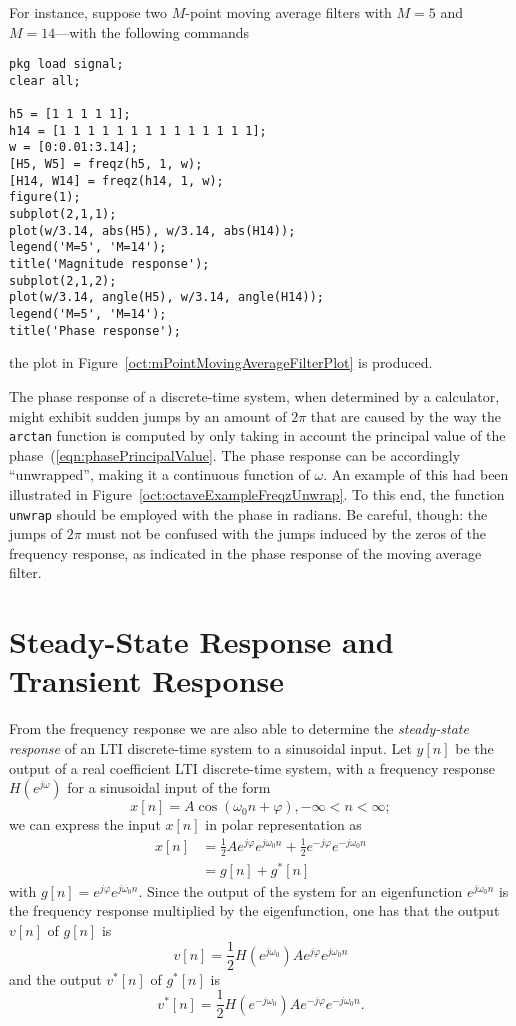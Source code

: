 \documentclass[\documentfontsize, twocolumn]{\classname}
\begin{document}
For instance, suppose two $M$-point moving average filters with $M=5$ and $M=14$---with the following commands
\begin{verbatim}
pkg load signal;
clear all;

h5 = [1 1 1 1 1];
h14 = [1 1 1 1 1 1 1 1 1 1 1 1 1 1];
w = [0:0.01:3.14];
[H5, W5] = freqz(h5, 1, w);
[H14, W14] = freqz(h14, 1, w);
figure(1);
subplot(2,1,1);
plot(w/3.14, abs(H5), w/3.14, abs(H14));
legend('M=5', 'M=14');
title('Magnitude response');
subplot(2,1,2);
plot(w/3.14, angle(H5), w/3.14, angle(H14));
legend('M=5', 'M=14');
title('Phase response');
\end{verbatim}
the plot in Figure~\ref{oct:mPointMovingAverageFilterPlot} is produced.

The phase response of a discrete-time system, when determined by a calculator, might exhibit sudden jumps by an amount of $2\pi$ that are caused by the way the \texttt{arctan} function is computed by only taking in account the principal value of the phase~(\ref{eqn:phasePrincipalValue}. The phase response can be accordingly ``unwrapped'', making it a continuous function of $\omega$. An example of this had been illustrated in Figure~\ref{oct:octaveExampleFreqzUnwrap}. To this end, the function \texttt{unwrap} should be employed with the phase in radians. Be careful, though: the jumps of $2\pi$ must not be confused with the jumps induced by the zeros of the frequency response, as indicated in the phase response of the moving average filter.

\section{Steady-State Response and Transient Response}
From the frequency response we are also able to determine the \emph{steady-state response} of an LTI discrete-time system to a sinusoidal input.
Let $y[n]$ be the output of a real coefficient LTI discrete-time system, with a frequency response $H(e^{j\omega})$ for a sinusoidal input of the form
\[
    x[n] = A\cos{(\omega_0 n + \varphi)}, -\infty < n < \infty;
\]
we can express the input $x[n]$ in polar representation as
\begin{align*}
    x[n] &= \frac 1 2 Ae^{j\varphi}e^{j\omega_0 n} + \frac 1 2 e^{-j\varphi}e^{-j\omega_0 n}\\
         &= g[n] + g^*[n]
\end{align*}
with $g[n] = e^{j\varphi}e^{j\omega_0n}$. Since the output of the system for an eigenfunction $e^{j\omega_0n}$ is the frequency response multiplied by the eigenfunction, one has that the output $v[n]$ of $g[n]$ is
\[
    v[n] = \frac 1 2 H(e^{j\omega_0})Ae^{j\varphi}e^{j\omega_0n}
\]
and the output $v^*[n]$ of $g^*[n]$ is
\[
    v^*[n] = \frac 1 2 H(e^{-j\omega_0})Ae^{-j\varphi}e^{-j\omega_0n}.
\]
\end{document}
